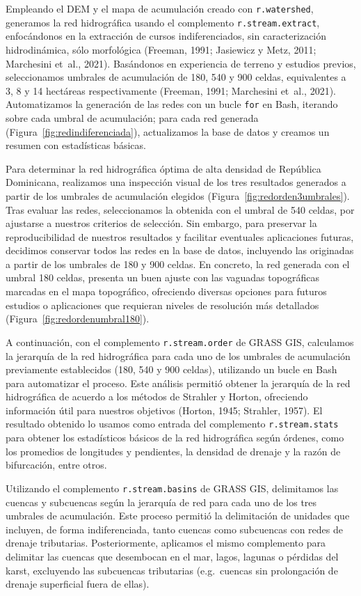 \documentclass[spanish]{article}
\begin{document}
Empleando el DEM y el mapa de acumulación creado con
\texttt{r.watershed}, generamos la red hidrográfica usando el
complemento \texttt{r.stream.extract}, enfocándonos en la extracción de
cursos indiferenciados, sin caracterización hidrodinámica, sólo
morfológica (Freeman, 1991; Jasiewicz y Metz, 2011; Marchesini et~al.,
2021). Basándonos en experiencia de terreno y estudios previos,
seleccionamos umbrales de acumulación de 180, 540 y 900 celdas,
equivalentes a 3, 8 y 14 hectáreas respectivamente (Freeman, 1991;
Marchesini et~al., 2021). Automatizamos la generación de las redes con
un bucle \texttt{for} en Bash, iterando sobre cada umbral de
acumulación; para cada red generada
(Figura~\ref{fig:redindiferenciada}), actualizamos la base de datos y
creamos un resumen con estadísticas básicas.

Para determinar la red hidrográfica óptima de alta densidad de República
Dominicana, realizamos una inspección visual de los tres resultados
generados a partir de los umbrales de acumulación elegidos
(Figura~\ref{fig:redorden3umbrales}). Tras evaluar las redes,
seleccionamos la obtenida con el umbral de 540 celdas, por ajustarse a
nuestros criterios de selección. Sin embargo, para preservar la
reproducibilidad de nuestros resultados y facilitar eventuales
aplicaciones futuras, decidimos conservar todos las redes en la base de
datos, incluyendo las originadas a partir de los umbrales de 180 y 900
celdas. En concreto, la red generada con el umbral 180 celdas, presenta
un buen ajuste con las vaguadas topográficas marcadas en el mapa
topográfico, ofreciendo diversas opciones para futuros estudios o
aplicaciones que requieran niveles de resolución más detallados
(Figura~\ref{fig:redordenumbral180}).

A continuación, con el complemento \texttt{r.stream.order} de GRASS GIS,
calculamos la jerarquía de la red hidrográfica para cada uno de los
umbrales de acumulación previamente establecidos (180, 540 y 900
celdas), utilizando un bucle en Bash para automatizar el proceso. Este
análisis permitió obtener la jerarquía de la red hidrográfica de acuerdo
a los métodos de Strahler y Horton, ofreciendo información útil para
nuestros objetivos (Horton, 1945; Strahler, 1957). El resultado obtenido
lo usamos como entrada del complemento \texttt{r.stream.stats} para
obtener los estadísticos básicos de la red hidrográfica según órdenes,
como los promedios de longitudes y pendientes, la densidad de drenaje y
la razón de bifurcación, entre otros.

Utilizando el complemento \texttt{r.stream.basins} de GRASS GIS,
delimitamos las cuencas y subcuencas según la jerarquía de red para cada
uno de los tres umbrales de acumulación. Este proceso permitió la
delimitación de unidades que incluyen, de forma indiferenciada, tanto
cuencas como subcuencas con redes de drenaje tributarias.
Posteriormente, aplicamos el mismo complemento para delimitar las
cuencas que desembocan en el mar, lagos, lagunas o pérdidas del karst,
excluyendo las subcuencas tributarias (e.g.~cuencas sin prolongación de
drenaje superficial fuera de ellas).
\end{document}
